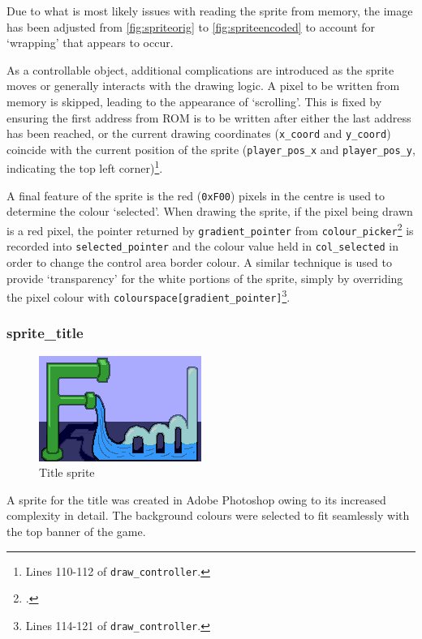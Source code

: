 Due to what is most likely issues with reading the sprite from memory, the image has been 
adjusted from \cref{fig:spriteorig} to \cref{fig:spriteencoded} to account for `wrapping'
that appears to occur. 

As a controllable object, additional complications are introduced as the sprite moves or 
generally interacts with the drawing logic. A pixel to be written from memory is skipped, 
leading to the appearance of `scrolling'. This is fixed by ensuring the first address 
from ROM is to be written after either the last address has been reached, or the 
current drawing coordinates (\lstinline|x_coord| and \lstinline|y_coord|) coincide with 
the current position of the sprite (\lstinline|player_pos_x| and \lstinline|player_pos_y|,
indicating the top left corner)\footnote{
    Lines 110-112 of \lstinline|draw_controller|.
}.

A final feature of the sprite is the red (\lstinline|0xF00|) pixels in the centre is 
used to determine the colour `selected'. When drawing the sprite, if the pixel being drawn is 
a red pixel, the pointer returned by \lstinline|gradient_pointer| from \lstinline|colour_picker|\footnote{
    .
} 
is recorded into \lstinline|selected_pointer| and the colour value held in \lstinline|col_selected|
in order to change the control area border colour. A similar technique is used to provide `transparency'
for the white portions of the sprite, simply by overriding the pixel colour 
with \lstinline|colourspace[gradient_pointer]|\footnote{
    Lines 114-121 of \lstinline|draw_controller|.
}.

\subsubsection{sprite\_title}
\begin{figure}
    \vspace{-30pt}
    \centering
    \includegraphics[width=\linewidth]{figures/flood.png}
    \caption{Title sprite}
\end{figure}
A sprite for the title was created in Adobe Photoshop owing to its increased complexity in detail. 
The background colours were selected to fit seamlessly with the top banner of the game. 

